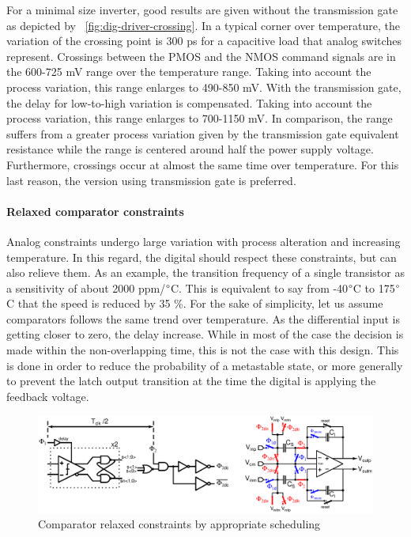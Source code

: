 For a minimal size inverter, good results are given without the transmission gate as depicted by \figurename~\ref{fig:dig-driver-crossing}. In a typical corner over temperature, the variation of the crossing point is 300 ps for a capacitive load that analog switches represent. Crossings between the PMOS and the NMOS command signals are in the 600-725 mV range over the temperature range. Taking into account the process variation, this range enlarges to 490-850 mV. With the transmission gate, the delay for low-to-high variation is compensated. Taking into account the process variation, this range enlarges to 700-1150 mV. In comparison, the range suffers from a greater process variation given by the transmission gate equivalent resistance while the range is centered around half the power supply voltage. Furthermore, crossings occur at almost the same time over temperature. For this last reason, the version using transmission gate is preferred.
\paragraph{Relaxed comparator constraints}

Analog constraints undergo large variation with process alteration and increasing temperature. In this regard, the digital should respect these constraints, but can also relieve them. As an example, the transition frequency of a single transistor as a sensitivity of about 2000 ppm/\(\degree \)C. This is equivalent to say from -40\(\degree \)C to 175\(\degree \)C that the speed is reduced by 35 \%. For the sake of simplicity, let us assume comparators follows the same trend over temperature. As the differential input is getting closer to zero, the delay increase. While in most of the case the decision is made within the non-overlapping time, this is not the case with this design. This is done in order to reduce the probability of a metastable state, or more generally to prevent the latch output transition at the time the digital is applying the feedback voltage.
\begin{figure}[htp]
	\centering
	\includegraphics[width=\textwidth]{Chapter4/Figs/comp-timing-isd.ps}
	\caption{Comparator relaxed constraints by appropriate scheduling}
	\label{fig:comp-timing}
\end{figure}

